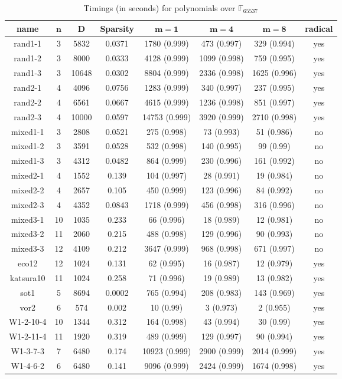 \documentclass[12pt]{article}
\def\F {\ensuremath{\mathbb{F}}}
\begin{document}
\begin{table}[H]
 \def\arraystretch{1.2}
\setlength\tabcolsep{6pt}
	\caption{Timings (in seconds) for polynomials over $\F_{65537}$}
	\begin{tabular}{c|c|c|c|c|c|c|c}
		\textbf{name}& $\bm{n}$ & $\bm{D}$ & \textbf{Sparsity} & $\bm{m = 1}$ & $\bm{m = 4}$ & $\bm{m = 8}$ & radical \\
		\hline
		rand1-1&3 &5832&0.0371&1780 (0.999)&473 (0.997)&329 (0.994)&yes\\
		rand1-2&3 &8000&0.0333&4128 (0.999)&1099 (0.998)&759 (0.995)&yes\\
		rand1-3&3 &10648&0.0302&8804 (0.999)&2336 (0.998)&1625 (0.996)&yes\\
		rand2-1&4 &4096&0.0756&1283 (0.999)&340 (0.997)&237 (0.995)&yes\\
		rand2-2&4 &6561&0.0667&4615 (0.999)&1236 (0.998)&851 (0.997)&yes\\
		rand2-3&4 &10000&0.0597&14753 (0.999)&3920 (0.999)&2710 (0.998)&yes\\
		
		mixed1-1&3 &2808&0.0521&275 (0.998)&73 (0.993)&51 (0.986)&no\\
		mixed1-2&3 &3591&0.0528&532 (0.998)&140 (0.995)&99 (0.99)&no\\
		mixed1-3&3 &4312&0.0482&864 (0.999)&230 (0.996)&161 (0.992)&no\\
		mixed2-1&4 &1552&0.139&104 (0.997)&28 (0.991)&19 (0.984)&no\\
		mixed2-2&4 &2657&0.105&450 (0.999)&123 (0.996)&84 (0.992)&no\\
		mixed2-3&4 &4352&0.0843&1718 (0.999)&456 (0.998)&316 (0.996)&no\\
		
		mixed3-1&10 &1035&0.233&66 (0.996)&18 (0.989)&12 (0.981)&no\\
		mixed3-2&11 &2060&0.215&488 (0.998)&129 (0.996)&90 (0.993)&no\\
		mixed3-3&12 &4109&0.212&3647 (0.999)&968 (0.998)&671 (0.997)&no\\
		
		eco12&12 &1024&0.131&62 (0.995)&16 (0.987)&12 (0.979)&yes\\
		katsura10&11 &1024&0.258&71 (0.996)&19 (0.989)&13 (0.982)&yes\\
		sot1&5 &8694&0.0002&765 (0.994)&208 (0.983)&143 (0.969)&yes\\
		vor2&6 &574&0.002&10 (0.99)&3 (0.973)&2 (0.955)&yes\\
		W1-2-10-4&10 &1344&0.312&164 (0.998)&43 (0.994)&30 (0.99)&yes\\
		W1-2-11-4&11 &1920&0.319&489 (0.999)&129 (0.997)&90 (0.994)&yes\\
		W1-3-7-3&7 &6480&0.174&10923 (0.999)&2900 (0.999)&2014 (0.999)&yes\\
		W1-4-6-2&6 &6480&0.141&9096 (0.999)&2424 (0.999)&1674 (0.998)&yes
	\end{tabular}
\end{table}
\end{document}
